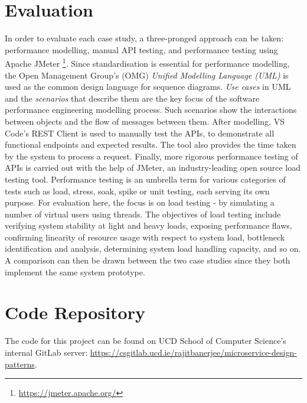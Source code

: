 \section{Evaluation}

In order to evaluate each case study, a three-pronged approach can be taken: performance modelling, manual API testing, and performance testing using Apache JMeter \footnote{\url{https://jmeter.apache.org/}}. Since standardisation is essential for performance modelling, the Open Management Group's (OMG) \textit{Unified Modelling Language (UML)} is used as the common design language for sequence diagrams. \textit{Use cases} in UML and the \textit{scenarios} that describe them are the key focus of the software performance engineering modelling process. Such scenarios show the interactions between objects and the flow of messages between them. After modelling, VS Code's REST Client is used to manually test the APIs, to demonstrate all functional endpoints and expected results. The tool also provides the time taken by the system to process a request. Finally, more rigorous performance testing of APIs is carried out with the help of JMeter, an industry-leading open source load testing tool. Performance testing is an umbrella term for various categories of tests such as load, stress, soak, spike or unit testing, each serving its own purpose. For evaluation here, the focus is on load testing - by simulating a number of virtual users using threads. The objectives of load testing include verifying system stability at light and heavy loads, exposing performance flaws, confirming linearity of resource usage with respect to system load, bottleneck identification and analysis, determining system load handling capacity, and so on. A comparison can then be drawn between the two case studies since they both implement the same system prototype.

\section{Code Repository}

The code for this project can be found on UCD School of Computer Science's internal GitLab server: \url{https://csgitlab.ucd.ie/rajitbanerjee/microservice-design-patterns}.
